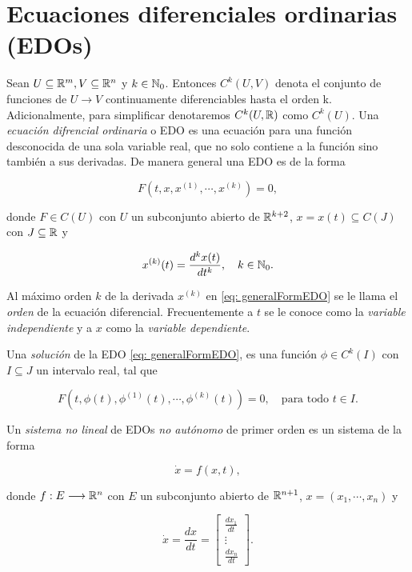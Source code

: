 \section{Ecuaciones diferenciales ordinarias (EDOs)}

Sean $U \subseteq {\mathbb{R}}^{m}, V \subseteq {\mathbb{R}}^{n}$ y $k\in {\mathbb{N}}_{0}$. Entonces $C^{k}(U, V)$ denota el conjunto de funciones de $U \longrightarrow V$ continuamente diferenciables hasta el orden k. Adicionalmente, para simplificar denotaremos $C^{k}(U, {\mathbb{R}})$ como $C^{k}(U)$. Una \textit{ecuación difrencial ordinaria} o EDO es una ecuación para una función desconocida de una sola variable real, que no solo contiene a la función sino también a sus derivadas. De manera general una EDO es de la forma

\begin{equation}
	F(t, x, x^{(1)}, \cdots, x^{(k)}) = 0,
	\label{eq: generalFormEDO}
\end{equation}

donde $F \in C(U)$ con $U$ un subconjunto abierto de ${\mathbb{R}}^{k+2}$, $x = x(t) \subseteq C(J)$ con $J \subseteq {\mathbb{R}}$ y

\begin{equation*}
	x^{(k)}(t) = \frac{d^{k}x(t)}{dt^{k}}, \quad k \in {\mathbb{N}}_{0}.
\end{equation*}

Al máximo orden $k$ de la derivada $x^{(k)}$ en \eqref{eq: generalFormEDO} se le llama el \textit{orden} de la ecuación diferencial. Frecuentemente a $t$ se le conoce como la \textit{variable independiente} y a $x$ como la \textit{variable dependiente}.

Una \textit{solución} de la EDO \eqref{eq: generalFormEDO}, es una función $\phi \in C^{k}(I)$ con $I \subseteq J$ un intervalo real, tal que

\begin{equation*}
	F(t, \phi(t), \phi^{(1)}(t), \cdots, \phi^{(k)}(t)) = 0, \quad \text{para todo } t \in I.
\end{equation*}

Un \textit{sistema no lineal} de EDOs \textit{no autónomo} de primer orden es un sistema de la forma

\begin{equation}
	\dot{x} = f(x, t),
	\label{eq:generalFormSisEDOs}
\end{equation}

donde $f:E \longrightarrow {\mathbb{R}}^{n}$ con $E$ un subconjunto abierto de ${\mathbb{R}}^{n+1}$, $x = (x_{1}, \cdots, x_{n})$ y

\begin{equation*}
	\dot{x} = \frac{dx}{dt} = 
	\begin{bmatrix}
		\frac{dx_{1}}{dt} \\
		\vdots \\
		\frac{dx_{n}}{dt}
	\end{bmatrix}.
\end{equation*}

